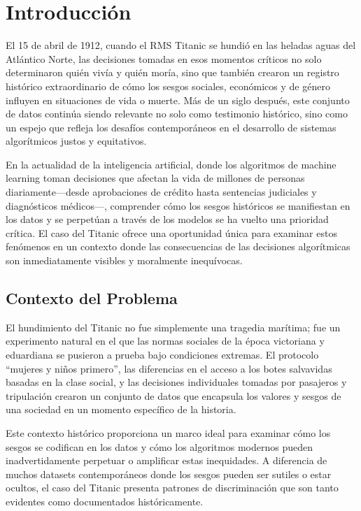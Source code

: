 \documentclass[conference]{IEEEtran}
\begin{document}
\section{Introducción}

El 15 de abril de 1912, cuando el RMS Titanic se hundió en las heladas aguas del Atlántico Norte, las decisiones tomadas en esos momentos críticos no solo determinaron quién vivía y quién moría, sino que también crearon un registro histórico extraordinario de cómo los sesgos sociales, económicos y de género influyen en situaciones de vida o muerte. Más de un siglo después, este conjunto de datos continúa siendo relevante no solo como testimonio histórico, sino como un espejo que refleja los desafíos contemporáneos en el desarrollo de sistemas algorítmicos justos y equitativos.

En la actualidad de la inteligencia artificial, donde los algoritmos de machine learning toman decisiones que afectan la vida de millones de personas diariamente—desde aprobaciones de crédito hasta sentencias judiciales y diagnósticos médicos—, comprender cómo los sesgos históricos se manifiestan en los datos y se perpetúan a través de los modelos se ha vuelto una prioridad crítica. El caso del Titanic ofrece una oportunidad única para examinar estos fenómenos en un contexto donde las consecuencias de las decisiones algorítmicas son inmediatamente visibles y moralmente inequívocas.

\subsection{Contexto del Problema}

El hundimiento del Titanic no fue simplemente una tragedia marítima; fue un experimento natural en el que las normas sociales de la época victoriana y eduardiana se pusieron a prueba bajo condiciones extremas. El protocolo ``mujeres y niños primero'', las diferencias en el acceso a los botes salvavidas basadas en la clase social, y las decisiones individuales tomadas por pasajeros y tripulación crearon un conjunto de datos que encapsula los valores y sesgos de una sociedad en un momento específico de la historia.

Este contexto histórico proporciona un marco ideal para examinar cómo los sesgos se codifican en los datos y cómo los algoritmos modernos pueden inadvertidamente perpetuar o amplificar estas inequidades. A diferencia de muchos datasets contemporáneos donde los sesgos pueden ser sutiles o estar ocultos, el caso del Titanic presenta patrones de discriminación que son tanto evidentes como documentados históricamente.
\end{document}
